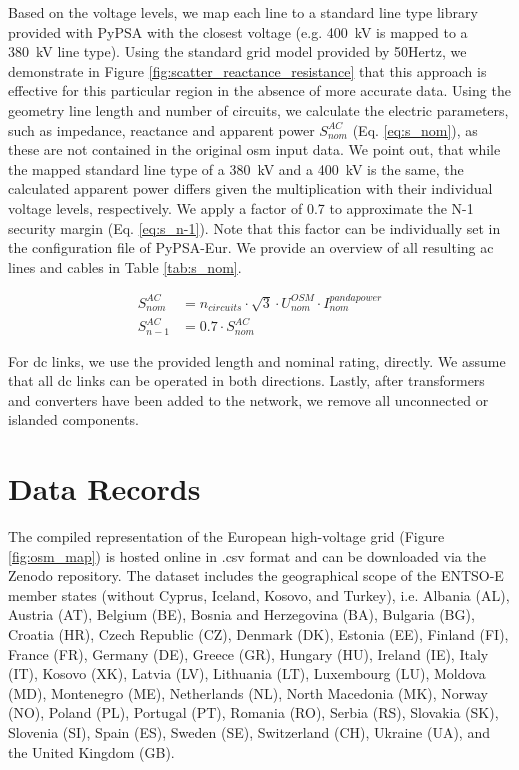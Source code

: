 \documentclass[fleqn,10pt]{wlscirep}
\let\autocite\cite
\begin{document}
Based on the voltage levels, we map each line to a standard line type library provided with PyPSA \autocite{brownPyPSAPythonPower2018,horschPyPSAEurOpenOptimisation2018,oedingElektrischeKraftwerkeUnd2016,thurnerPandapowerOpenSourcePython2018} with the closest voltage (e.g. \SI{400}{\kilo\volt} is mapped to a \SI{380}{\kilo\volt} line type). Using the standard grid model provided by 50Hertz, \autocite{50hertzStaticGridModel2022} we demonstrate in Figure \ref{fig:scatter_reactance_resistance} that this approach is effective for this particular region in the absence of more accurate data. Using the geometry line length and number of circuits, we calculate the electric parameters, such as impedance, reactance and apparent power $S_{nom}^{AC}$ (Eq. \ref{eq:s_nom}), as these are not contained in the original \gls{osm} input data. We point out, that while the mapped standard line type of a \SI{380}{\kilo\volt} and a \SI{400}{\kilo\volt} is the same, the calculated apparent power differs given the multiplication with their individual voltage levels, respectively. We apply a factor of 0.7 to approximate the N-1 security margin (Eq. \ref{eq:s_n-1}). \autocite{shokrigazafroudiTopologybasedApproximationsN12022,horschPyPSAEurOpenOptimisation2018} Note that this factor can be individually set in the configuration file of PyPSA-Eur. We provide an overview of all resulting \acrshort{ac} lines and cables in Table \ref{tab:s_nom}.

\begin{align}
    S_{nom}^{AC} &= n_{circuits}\cdot\sqrt{3}\cdot U_{nom}^{OSM} \cdot I_{nom}^
    {pandapower} \label{eq:s_nom} \\
    S_{n-1}^{AC} &= 0.7 \cdot S_{nom}^{AC} \label{eq:s_n-1}
\end{align}


For \acrshort{dc} links, we use the provided length and nominal rating, directly. We assume that all \acrshort{dc} links can be operated in both directions. Lastly, after transformers and converters have been added to the network, we remove all unconnected or islanded components. 

\section*{Data Records}
The compiled representation of the European high-voltage grid (Figure \ref{fig:osm_map}) is hosted online in .csv format and can be downloaded via the Zenodo repository.\autocite{xiongPrebuiltElectricityNetwork2024} The dataset includes the geographical scope of the ENTSO-E member states (without Cyprus, Iceland, Kosovo, and Turkey), i.e. Albania (AL), Austria (AT), Belgium (BE), Bosnia and Herzegovina (BA), Bulgaria (BG), Croatia (HR), Czech Republic (CZ), Denmark (DK), Estonia (EE), Finland (FI), France (FR), Germany (DE), Greece (GR), Hungary (HU), Ireland (IE), Italy (IT), Kosovo (XK), Latvia (LV), Lithuania (LT), Luxembourg (LU), Moldova (MD), Montenegro (ME), Netherlands (NL), North Macedonia (MK), Norway (NO), Poland (PL), Portugal (PT), Romania (RO), Serbia (RS), Slovakia (SK), Slovenia (SI), Spain (ES), Sweden (SE), Switzerland (CH), Ukraine (UA), and the United Kingdom (GB).
\end{document}
